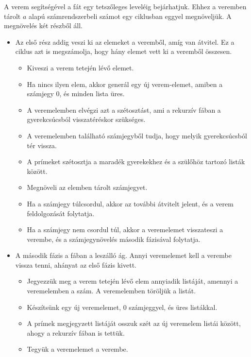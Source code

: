 \documentclass[12pt]{report}
\begin{document}
A verem segítségével a fát egy tetszőleges leveléig bejárhatjuk.
Ehhez a veremben tárolt $a$ alapú számrendszerbeli számot egy ciklusban
eggyel megnöveljük.
A megnövelés két részből áll.
\begin{itemize}
\item
Az első rész addig veszi ki az elemeket a veremből,
amíg van átvitel.
Ez a ciklus azt is megszámolja, hogy hány elemet vett ki a veremből összesen.
\begin{itemize}
\item Kiveszi a verem tetején lévő elemet.
\item Ha nincs ilyen elem, akkor generál egy új verem-elemet,
amiben a számjegy $0$, és minden lista üres.
\item A veremelemben elvégzi azt a szétosztást,
ami a rekurzív fában a gyerekcsúcsból visszatéréskor szükséges.
\item
A veremelemben található számjegyből tudja, hogy melyik gyerekcsúcsból tér vissza.
\item A prímeket szétosztja a maradék gyerekekhez és a szülőhöz
tartozó listák között.
\item Megnöveli az elemben tárolt számjegyet.
\item Ha a számjegy túlcsordul, akkor az további átvitelt jelent,
és a verem feldolgozását folytatja.
\item Ha a számjegy nem csordul túl, akkor a veremelemet visszateszi a verembe,
és a számjegynövelés második fázisával folytatja.
\end{itemize}
\item
A második fázis a fában a leszálló ág.
Annyi veremelemet kell a verembe vissza tenni, ahányat az első fázis kivett.
\begin{itemize}
\item Jegyezzük meg a verem tetején lévő elem annyiadik listáját,
amennyi a veremelemben a szám.
A veremelemben töröljük a listát.
\item Készítsünk egy új veremelemet, $0$ számjeggyel, és üres listákkal.
\item A prímek megjegyzett listáját osszuk szét az új veremelem
listái között, ahogy a rekurzív fában is tettük.
\item Tegyük a veremelemet a verembe.
\end{itemize}
\end{itemize}
\end{document}
